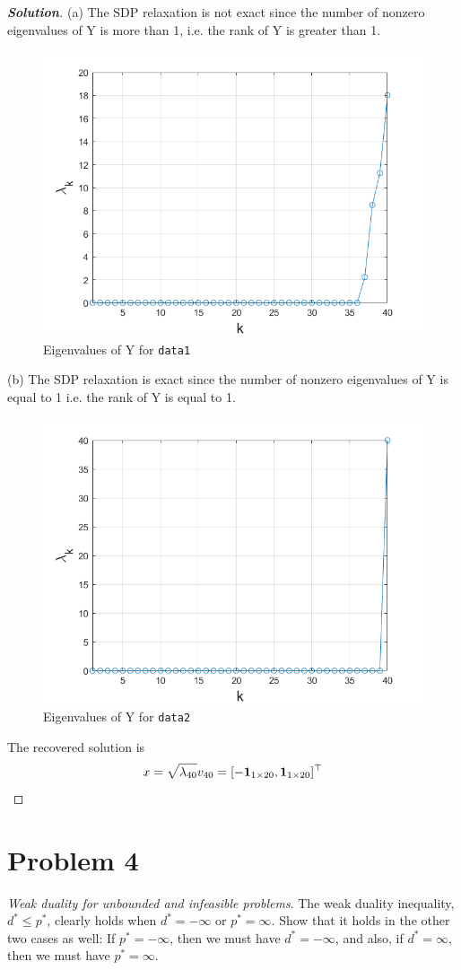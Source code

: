 \documentclass[11pt]{article}
\newenvironment{solution}
  {\renewcommand\qedsymbol{$\square$}\begin{proof}[\textbf{Solution}]}
  {\end{proof}}
\newcommand{\T}{^\top}
\begin{document}
\begin{solution}
  (a) The SDP relaxation is not exact since the number of nonzero eigenvalues of Y is more than 1, i.e. the rank of Y is greater than 1.
  \vspace{-1em}
  \begin{figure}[htb]
    \centering
    \includegraphics[width=0.45\columnwidth]{hw4p3a.png}
    \caption{Eigenvalues of Y for \texttt{data1}}
    \label{fig:p3a}
  \end{figure}

  (b) The SDP relaxation is exact since the number of nonzero eigenvalues of Y is equal to 1 i.e. the rank of Y is equal to 1.
  \vspace{-1em}
  \begin{figure}[htb]
    \centering
    \includegraphics[width=0.45\columnwidth]{hw4p3b.png}
    \caption{Eigenvalues of Y for \texttt{data2}}
    \label{fig:p3b}
  \end{figure}

  The recovered solution is 
  \[
  x = \sqrt{\lambda_{40}} v_{40} = [-\ones_{1\times 20}, \ones_{1\times 20}]\T
  \]
\end{solution}


\clearpage
\section*{Problem 4}
\textit{Weak duality for unbounded and infeasible problems}. 
The weak duality inequality, $d^* \leq p^*$,
clearly holds when $d^* = -\infty$ or $p^* = \infty$. Show that it holds in the other two cases as well: If $p^* = -\infty$, then we must have $d^* = -\infty$, and also, if $d^* = \infty$, then we must have $p^* = \infty$.
\end{document}

